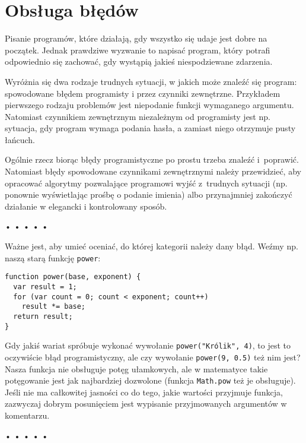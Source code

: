 \chapter{Obsługa błędów}
\label{chap:5}

  
Pisanie programów, które działają, gdy wszystko się udaje jest dobre na początek. Jednak prawdziwe wyzwanie to napisać program, który potrafi odpowiednio się zachować, gdy wystąpią jakieś niespodziewane zdarzenia.

  
Wyróżnia się dwa rodzaje trudnych sytuacji, w jakich może znaleźć się program: spowodowane błędem programisty i przez czynniki zewnętrzne. Przykładem pierwszego rodzaju problemów jest niepodanie funkcji wymaganego argumentu. Natomiast czynnikiem zewnętrznym niezależnym od programisty jest np. sytuacja, gdy program wymaga podania hasła, a zamiast niego otrzymuje pusty łańcuch.

  
Ogólnie rzecz biorąc błędy programistyczne po prostu trzeba znaleźć i~poprawić. Natomiast błędy spowodowane czynnikami zewnętrznymi należy przewidzieć, aby opracować algorytmy pozwalające programowi wyjść z~trudnych sytuacji (np. ponownie wyświetlając prośbę o podanie imienia) albo przynajmniej zakończyć działanie w elegancki i kontrolowany sposób.



\begin{center}
• • • • •
\end{center}

  
Ważne jest, aby umieć oceniać, do której kategorii należy dany błąd. Weźmy np. naszą starą funkcję \texttt{power}:

  
\begin{verbatim} 
function power(base, exponent) {
  var result = 1;
  for (var count = 0; count < exponent; count++)
    result *= base;
  return result;
}
 \end{verbatim}
  
Gdy jakiś wariat spróbuje wykonać wywołanie \texttt{power("Królik", 4)}, to jest to oczywiście błąd programistyczny, ale czy wywołanie \texttt{power(9, 0.5)} też nim jest? Nasza funkcja nie obsługuje potęg ułamkowych, ale w matematyce takie potęgowanie jest jak najbardziej dozwolone (funkcja \texttt{Math.pow} też je obsługuje). Jeśli nie ma całkowitej jasności co do tego, jakie wartości przyjmuje funkcja, zazwyczaj dobrym posunięciem jest wypisanie przyjmowanych argumentów w komentarzu.



\begin{center}
• • • • •
\end{center}

